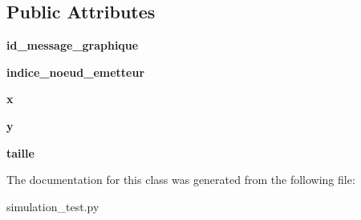 \subsection*{Public Attributes}
\begin{DoxyCompactItemize}
\item 
{\bfseries id\+\_\+message\+\_\+graphique}\hypertarget{classsimulation__test_1_1PaquetMessage_acf7d371cd051572549858cb325588db6}{}\label{classsimulation__test_1_1PaquetMessage_acf7d371cd051572549858cb325588db6}

\item 
{\bfseries indice\+\_\+noeud\+\_\+emetteur}\hypertarget{classsimulation__test_1_1PaquetMessage_a8cc690f42e29b74181996af247220f63}{}\label{classsimulation__test_1_1PaquetMessage_a8cc690f42e29b74181996af247220f63}

\item 
{\bfseries x}\hypertarget{classsimulation__test_1_1PaquetMessage_a8d8438555c326d97ecf114adb60f290e}{}\label{classsimulation__test_1_1PaquetMessage_a8d8438555c326d97ecf114adb60f290e}

\item 
{\bfseries y}\hypertarget{classsimulation__test_1_1PaquetMessage_aee3bcb312cd0c690547a25de02567727}{}\label{classsimulation__test_1_1PaquetMessage_aee3bcb312cd0c690547a25de02567727}

\item 
{\bfseries taille}\hypertarget{classsimulation__test_1_1PaquetMessage_a82334105f186ca40ba7dfed822ca9845}{}\label{classsimulation__test_1_1PaquetMessage_a82334105f186ca40ba7dfed822ca9845}

\end{DoxyCompactItemize}


The documentation for this class was generated from the following file\+:\begin{DoxyCompactItemize}
\item 
simulation\+\_\+test.\+py\end{DoxyCompactItemize}
